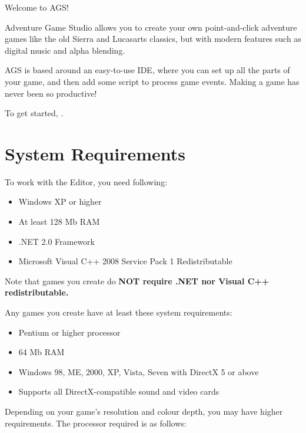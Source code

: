 Welcome to AGS!

Adventure Game Studio allows you to create your own point-and-click adventure
games like the old Sierra and Lucasarts classics, but with modern features
such as digital music and alpha blending.

AGS is based around an easy-to-use IDE, where you can set up all the parts of
your game, and then add some script to process game events. Making a game
has never been so productive!

To get started, .

\section{System Requirements}%

To work with the Editor, you need following:

\begin{itemize}\itemsep=0pt
\item Windows XP or higher
\item At least 128 Mb RAM
\item .NET 2.0 Framework
\item Microsoft Visual C++ 2008 Service Pack 1 Redistributable
\end{itemize}

Note that games you create do \bf{NOT} require .NET nor Visual C++ redistributable.

Any games you create have at least these system requirements:

\begin{itemize}\itemsep=0pt
\item Pentium or higher processor
\item 64 Mb RAM
\item Windows 98, ME, 2000, XP, Vista, Seven with DirectX 5 or above
\item Supports all DirectX-compatible sound and video cards
\end{itemize}

Depending on your game's resolution and colour depth, you may have higher requirements.
The processor required is as follows:


